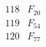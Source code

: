 \documentclass{article}
\begin{document}
{$$\begin{array}{|r|*{7}{r|}}
\\
\hline
118 
 & F_{20} &
 & 
 & 
 & 
 & 
 & 
\\
\hline
119 
 & F_{54} &
 & 
 & 
 & 
 & 
 & 
\\
\hline
120 
 & F_{77} &
 & 
 & 
 & 

\end{array}$$}
\end{document}
